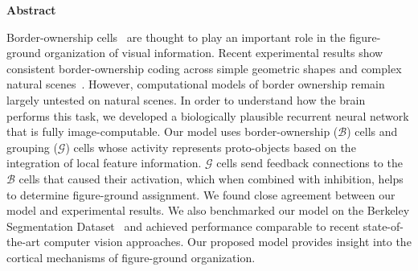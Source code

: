 \documentclass[12pt]{article}
\begin{document}


\begin{center} {\bf Abstract} \end{center}
Border-ownership cells~\citep{Zhou_etal00} are thought to play an important role in the figure-ground organization of visual information. Recent experimental results show consistent border-ownership coding across simple geometric shapes and complex natural scenes~\citep{Hesse_Tsao16,Williford_vonderHeydt16}. However, computational models of border ownership remain largely untested on natural scenes. In order to understand how the brain performs this task,
we developed a biologically plausible recurrent neural network that is fully image-computable. Our model uses border-ownership ($\mathcal{B}$) cells and grouping ($\mathcal{G}$) cells whose activity represents proto-objects based on the integration of local feature information. $\mathcal{G}$ cells send feedback connections to the $\mathcal{B}$ cells that caused their activation, which when combined with
inhibition,
helps to determine figure-ground assignment. We found close agreement between our model and experimental results.
%
%
We also benchmarked our model on the Berkeley Segmentation Dataset~\citep{Martin_etal01} and achieved performance comparable to recent state-of-the-art computer vision approaches. Our proposed model provides insight into the cortical mechanisms of figure-ground organization.
\end{document}
